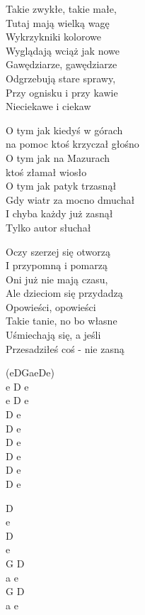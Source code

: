 \begin{text}
    \chordfill
    Takie zwykłe, takie małe,\\
    Tutaj mają wielką wagę\\
    Wykrzykniki kolorowe\\
    Wyglądają wciąż jak nowe\\
    Gawędziarze, gawędziarze\\
    Odgrzebują stare sprawy,\\
    Przy ognisku i przy kawie\\
    Nieciekawe i ciekaw

    \vin O tym jak kiedyś w górach\\
    \vin na pomoc ktoś krzyczał głośno\\
    \vin O tym jak na Mazurach\\
    \vin ktoś złamał wiosło\\
    \vin O tym jak patyk trzasnął\\
    \vin Gdy wiatr za mocno dmuchał\\
    \vin I chyba każdy już zasnął\\
    \vin Tylko autor słuchał

    Oczy szerzej się otworzą\\
    I przypomną i pomarzą\\
    Oni już nie mają czasu,\\
    Ale dzieciom się przydadzą\\
    Opowieści, opowieści\\
    Takie tanie, no bo własne\\
    Uśmiechają się, a jeśli\\
    Przesadziłeś coś - nie zasną
\end{text}
\begin{chord}
    (eDGaeDe)\\
    e D e\\
    e D e\\
    D e\\
    D e\\
    D e\\
    D e\\
    D e\\
    D e

    D\\
    e\\
    D\\
    e\\
    G D\\
    a e\\
    G D\\
    a e
\end{chord}